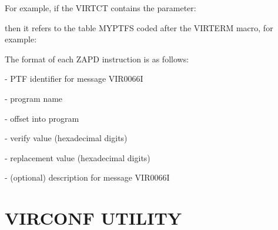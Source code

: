 \documentclass[letterpaper,10pt,english]{sphinxmanual}
\begin{document}
For example, if the VIRTCT contains the parameter:

\begin{sphinxVerbatim}[commandchars=\\\{\}]
 
\end{sphinxVerbatim}

then it refers to the table MYPTFS coded after the VIRTERM macro, for example:

\begin{sphinxVerbatim}[commandchars=\\\{\}]
   
  
   
\end{sphinxVerbatim}

The format of each ZAPD instruction is as follows:

\begin{sphinxVerbatim}[commandchars=\\\{\}]
  
\end{sphinxVerbatim}

 - PTF identifier for message VIR0066I

 - program name

 - offset into program

 - verify value (hexadecimal digits)

 - replacement value (hexadecimal digits)

 - (optional) description for message VIR0066I


\chapter{VIRCONF UTILITY}
\label{\detokenize{Installation_Guide:index-150}}\label{\detokenize{Installation_Guide:virconf-utility}}
\end{document}
